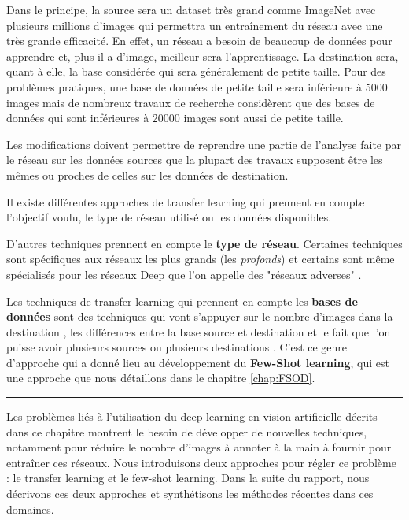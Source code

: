 Dans le principe, la source sera un dataset très grand comme ImageNet \cite{ILSVRC15} avec plusieurs millions d'images qui permettra un entraînement du réseau avec une très grande efficacité. En effet, un réseau a besoin de beaucoup de données pour apprendre et, plus il a d'image, meilleur sera l'apprentissage. La destination sera, quant à elle, la base considérée qui sera généralement de petite taille. Pour des problèmes pratiques, une base de données de petite taille sera inférieure à 5000 images mais de nombreux travaux de recherche considèrent que des bases de données qui sont inférieures à 20000 images sont aussi de petite taille.

Les modifications doivent permettre de reprendre une partie de l'analyse faite par le réseau sur les données sources que la plupart des travaux supposent être les mêmes ou proches de celles sur les données de destination.

Il existe différentes approches de transfer learning qui prennent en compte l'objectif voulu, le type de réseau utilisé ou les données disponibles.

D'autres techniques prennent en compte le \textbf{type de réseau}. Certaines techniques sont spécifiques aux réseaux les plus grands (les \textit{profonds}) \cite{DBLP:journals/corr/abs-1804-06275} et certains sont même spécialisés pour les réseaux Deep que l'on appelle des "réseaux adverses" \cite{DBLP:journals/corr/CaoL0J17}.

Les techniques de transfer learning qui prennent en compte les \textbf{bases de données} sont des techniques qui vont s'appuyer sur le nombre d'images dans la destination \cite{Sun_2019_CVPR}, les différences entre la base source et destination et le fait que l'on puisse avoir plusieurs sources ou plusieurs destinations \cite{Dwivedi_2019_CVPR}. C'est ce genre d'approche qui a donné lieu au développement du \textbf{Few-Shot learning}, qui est une approche que nous détaillons dans le chapitre \ref{chap:FSOD}.

\hspace{1pt}
\par\noindent\rule{\textwidth}{0.4pt}

Les problèmes liés à l'utilisation du deep learning en vision artificielle décrits dans ce chapitre montrent le besoin de développer de nouvelles techniques, notamment pour réduire le nombre d'images à annoter à la main à fournir pour entraîner ces réseaux. Nous introduisons deux approches pour régler ce problème : le transfer learning et le few-shot learning. Dans la suite du rapport, nous décrivons ces deux approches et synthétisons les méthodes récentes dans ces domaines.